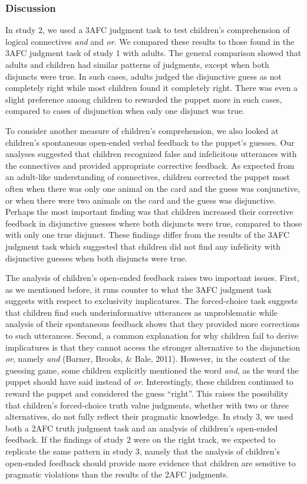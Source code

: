 \documentclass[floatsintext,man]{apa6}
\theoremstyle{definition}
\theoremstyle{definition}
\theoremstyle{definition}
\theoremstyle{remark}
\begin{document}
\subsubsection{Discussion}\label{discussion-1}

In study 2, we used a 3AFC judgment task to test children's
comprehension of logical connectives \emph{and} and \emph{or}. We
compared these results to those found in the 3AFC judgment task of study
1 with adults. The general comparison showed that adults and children
had similar patterns of judgments, except when both disjuncts were true.
In such cases, adults judged the disjunctive guess as not completely
right while most children found it completely right. There was even a
slight preference among children to rewarded the puppet more in such
cases, compared to cases of disjunction when only one disjunct was true.

To consider another measure of children's comprehension, we also looked
at children's spontaneous open-ended verbal feedback to the puppet's
guesses. Our analyses suggested that children recognized false and
infelicitous utterances with the connectives and provided appropriate
corrective feedback. As expected from an adult-like understanding of
connectives, children corrected the puppet most often when there was
only one animal on the card and the guess was conjunctive, or when there
were two animals on the card and the guess was disjunctive. Perhaps the
most important finding was that children increased their corrective
feedback in disjunctive guesses where both disjuncts were true, compared
to those with only one true disjunct. These findings differ from the
results of the 3AFC judgment task which suggested that children did not
find any infelicity with disjunctive guesses when both disjuncts were
true.

The analysis of children's open-ended feedback raises two important
issues. First, as we mentioned before, it runs counter to what the 3AFC
judgment task suggests with respect to exclusivity implicatures. The
forced-choice task suggests that children find such underinformative
utterances as unproblematic while analysis of their spontaneous feedback
shows that they provided more corrections to such utterances. Second, a
common explanation for why children fail to derive implicatures is that
they cannot access the stronger alternative to the disjunction
\emph{or}, namely \emph{and} (Barner, Brooks, \& Bale, 2011). However,
in the context of the guessing game, some children explicitly mentioned
the word \emph{and}, as the word the puppet should have said instead of
\emph{or}. Interestingly, these children continued to reward the puppet
and considered the guess \enquote{right}. This raises the possibility
that children's forced-choice truth value judgments, whether with two or
three alternatives, do not fully reflect their pragmatic knowledge. In
study 3, we used both a 2AFC truth judgment task and an analysis of
children's open-ended feedback. If the findings of study 2 were on the
right track, we expected to replicate the same pattern in study 3,
namely that the analysis of children's open-ended feedback should
provide more evidence that children are sensitive to pragmatic
violations than the results of the 2AFC judgments.
\end{document}

